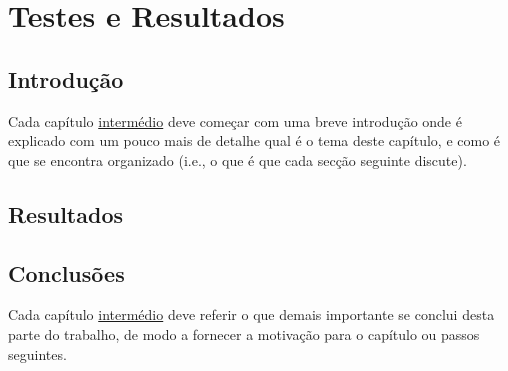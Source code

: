 \chapter{Testes e Resultados}
\label{chap:testes-resultados}

\section{Introdução}
\label{chap4:sec:intro}
Cada capítulo \underline{intermédio} deve começar com uma breve introdução onde é explicado com um pouco mais de detalhe qual é o tema deste capítulo, e como é que se encontra organizado (i.e., o que é que cada secção seguinte discute).


\section{Resultados}
\subsection{}
\section{}



\section{Conclusões}
\label{chap4:sec:concs}
Cada capítulo \underline{intermédio} deve referir o que demais importante se conclui desta parte do trabalho, de modo a fornecer a motivação para o capítulo ou passos seguintes.